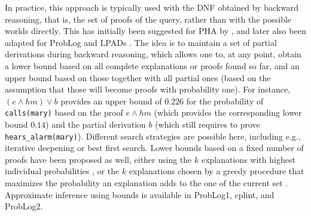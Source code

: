 \documentclass[a4paper]{article}
\begin{document}
In practice, this approach is typically used with the DNF obtained by
backward reasoning, that is, the set of proofs of the query, rather
than with the possible worlds
directly. This has initially been suggested for PHA by \cite{Poole92},
and later also been adapted for ProbLog
\citep{DeRaedt07-IJCAIa,Kimmig08} and LPADs \citep{bragaglia:ilp11}. The idea is to maintain a set of partial
derivations during backward reasoning, which allows one to, at any
point, obtain a lower bound based on all complete explanations or
proofs found so far, and an upper bound based on those together with
all partial ones (based on the assumption that those will become
proofs with probability one). For instance, $(e\wedge hm) \vee b$
provides an upper bound of $0.226$ for the probability of \verb|calls(mary)|
based on the proof $e\wedge hm$ (which provides the corresponding
lower bound $0.14$) and the partial derivation $b$ (which
still requires to prove \verb|hears_alarm(mary)|). Different search
strategies are possible here, including e.g., iterative deepening or
best first search. Lower bounds based on a fixed number of proofs
have been proposed as well, either using 
the $k$ explanations with
highest individual probabilities \citep{Kimmig11}, or the $k$
explanations chosen by a greedy procedure that maximizes the
probability an explanation adds to the one of the current set
\citep{Renkens12}. Approximate inference using bounds is available in
ProbLog1, cplint, and ProbLog2.
\end{document}
